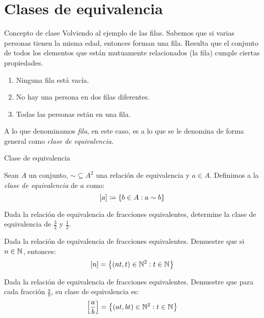 \section{Clases de equivalencia}
\begin{frame}{Concepto de clase}
	Volviendo al ejemplo de las filas. Sabemos que si varias personas tienen la misma edad, entonces forman una fila. Resulta que el conjunto de todos los elementos que están mutuamente relacionados (la fila) cumple ciertas propiedades.
	\begin{enumerate}
		\item Ninguna fila está vacía.
		\item No hay una persona en dos filas diferentes.
		\item Todas las personas están en una fila.
	\end{enumerate}
	A lo que denominamos \emph{fila}, en este caso, es a lo que se le denomina de forma general como \emph{clase de equivalencia}.
\end{frame}
\begin{frame}{Clase de equivalencia}
	\begin{mdefinition}
		Sean $ A $ un conjunto, $ \sim\subseteq A^{2} $ una relación de equivalencia y $ a\in A $. Definimos a la \emph{clase de equivalencia} de $ a $ como:
		\[ \bracket{a}\coloneqq\set{b\in A: a\sim b} \]
	\end{mdefinition}
\end{frame}
\begin{frame}
	\begin{exercise}
		Dada la relación de equivalencia de fracciones equivalentes, determine la clase de equivalencia de $ \frac{3}{2} $ y $ \frac{1}{2} $.
	\end{exercise}
\end{frame}
\begin{frame}
	
\end{frame}
\begin{frame}
	\begin{exercise}
		Dada la relación de equivalencia de fracciones equivalentes. Demuestre que si $ n\in\nmath $, entonces:
		\[ \bracket{n} =\set{(nt, t)\in\nmath[2]: t\in\nmath} \]
	\end{exercise}
\end{frame}
\begin{frame}
	
\end{frame}
\begin{frame}
	\begin{exercise}
		Dada la relación de equivalencia de fracciones equivalentes. Demuestre que para cada fracción $ \frac{a}{b} $, su clase de equivalencia es:
		\[ \bracket{\dfrac{a}{b}} =\set{(at, bt)\in\nmath[2]: t\in\nmath} \]
	\end{exercise}
\end{frame}
